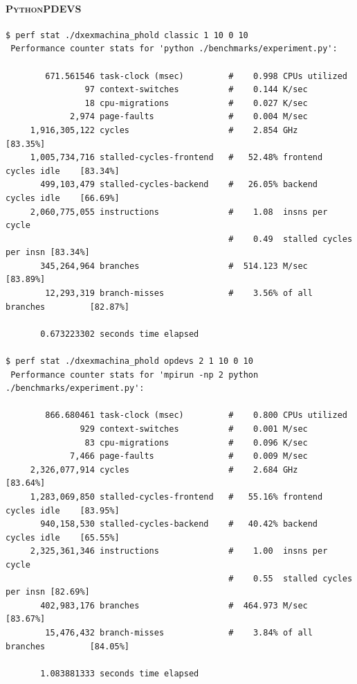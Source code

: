 \documentclass[8pt,a4paper]{report}
\begin{document}
\paragraph{\textsc{PythonPDEVS}}
\begin{Verbatim}[fontsize=\small]
$ perf stat ./dxexmachina_phold classic 1 10 0 10
 Performance counter stats for 'python ./benchmarks/experiment.py':

        671.561546 task-clock (msec)         #    0.998 CPUs utilized          
                97 context-switches          #    0.144 K/sec                  
                18 cpu-migrations            #    0.027 K/sec                  
             2,974 page-faults               #    0.004 M/sec                  
     1,916,305,122 cycles                    #    2.854 GHz                     [83.35%]
     1,005,734,716 stalled-cycles-frontend   #   52.48% frontend cycles idle    [83.34%]
       499,103,479 stalled-cycles-backend    #   26.05% backend  cycles idle    [66.69%]
     2,060,775,055 instructions              #    1.08  insns per cycle        
                                             #    0.49  stalled cycles per insn [83.34%]
       345,264,964 branches                  #  514.123 M/sec                   [83.89%]
        12,293,319 branch-misses             #    3.56% of all branches         [82.87%]

       0.673223302 seconds time elapsed
       
$ perf stat ./dxexmachina_phold opdevs 2 1 10 0 10
 Performance counter stats for 'mpirun -np 2 python ./benchmarks/experiment.py':

        866.680461 task-clock (msec)         #    0.800 CPUs utilized          
               929 context-switches          #    0.001 M/sec                  
                83 cpu-migrations            #    0.096 K/sec                  
             7,466 page-faults               #    0.009 M/sec                  
     2,326,077,914 cycles                    #    2.684 GHz                     [83.64%]
     1,283,069,850 stalled-cycles-frontend   #   55.16% frontend cycles idle    [83.95%]
       940,158,530 stalled-cycles-backend    #   40.42% backend  cycles idle    [65.55%]
     2,325,361,346 instructions              #    1.00  insns per cycle        
                                             #    0.55  stalled cycles per insn [82.69%]
       402,983,176 branches                  #  464.973 M/sec                   [83.67%]
        15,476,432 branch-misses             #    3.84% of all branches         [84.05%]

       1.083881333 seconds time elapsed
\end{Verbatim}
\end{document}

